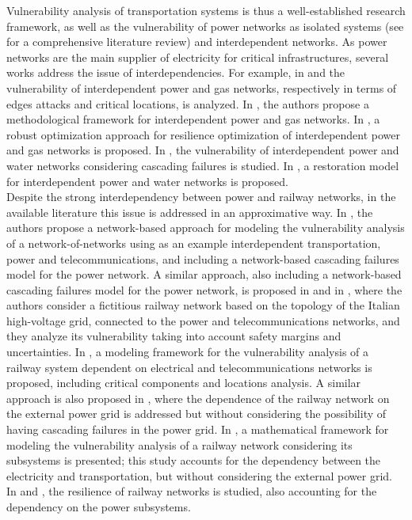 \documentclass[review]{elsarticle}
\begin{document}
	Vulnerability analysis of transportation systems is thus a well-established research framework, as well as the vulnerability of power networks as isolated systems (see \cite{abedi2019review} for a comprehensive literature review) and interdependent networks. As power networks are the main supplier of electricity for critical infrastructures, several works address the issue of interdependencies. For example, in \cite{wang2013vulnerability} and \cite{ouyang2016critical} the vulnerability of interdependent power and gas networks, respectively in terms of edges attacks and critical locations, is analyzed. In \cite{ouyang2009methodological}, the authors propose a methodological framework for interdependent power and gas networks. In \cite{fang2019adaptive}, a robust optimization approach for resilience optimization of interdependent power and gas networks is proposed. In \cite{zhang2016modeling}, the vulnerability of interdependent power and water networks considering cascading failures is studied. In \cite{almoghathawi2019resilience}, a restoration model for interdependent power and water networks is proposed.\\
	Despite the strong interdependency between power and railway networks, in the available literature this issue is addressed in an approximative way. In \cite{zhang2014approach}, the authors propose a network-based approach for modeling the vulnerability analysis of a network-of-networks using as an example interdependent transportation, power and telecommunications, and including a network-based cascading failures model for the power network. A similar approach, also including a network-based cascading failures model for the power network, is proposed in \cite{zio2010modeling} and in \cite{zio2011modeling}, where the authors consider a fictitious railway network based on the topology of the Italian high-voltage grid, connected to the power and telecommunications networks, and they analyze its vulnerability taking into account safety margins and uncertainties. In \cite{johansson2010approach}, a modeling framework for the vulnerability analysis of a railway system dependent on electrical and telecommunications networks is proposed, including critical components and locations analysis. A similar approach is also proposed in \cite{johansson2011vulnerability}, where the dependence of the railway network on the external power grid is addressed but without considering the possibility of having cascading failures in the power grid. In \cite{pant2016vulnerability}, a mathematical framework for modeling the vulnerability analysis of a railway network considering its subsystems is presented; this study accounts for the dependency between the electricity and transportation, but without considering the external power grid. In \cite{adjetey2016model} and \cite{dorbritz2011assessing}, the resilience of railway networks is studied, also accounting for the dependency on the power subsystems.\\
\end{document}
